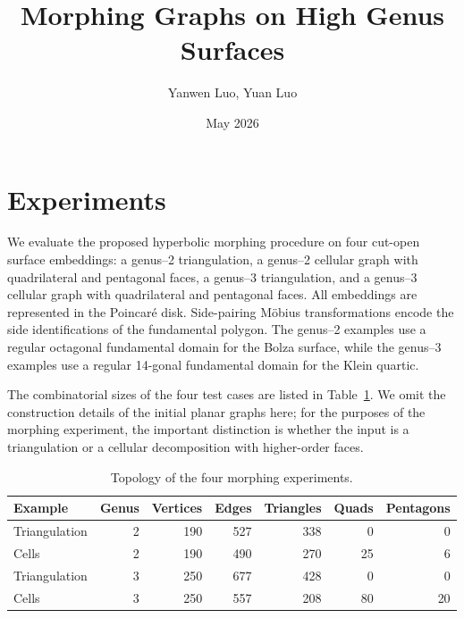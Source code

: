 \documentclass[12pt]{article}
\author{Yanwen Luo, Yuan Luo}
\title{Morphing Graphs on High Genus Surfaces}
\date{May 2026}
\theoremstyle{definition}
\theoremstyle{remark}
\numberwithin{equation}{section}
\begin{document}
\maketitle
\providecommand{\MorphFigurePath}{pictures}
\svgpath{{\MorphFigurePath/}}

\section{Experiments}
\label{sec:experiments}

We evaluate the proposed hyperbolic morphing procedure on four cut-open surface embeddings: a genus--2 triangulation, a genus--2 cellular graph with quadrilateral and pentagonal faces, a genus--3 triangulation, and a genus--3 cellular graph with quadrilateral and pentagonal faces. All embeddings are represented in the Poincaré disk. Side-pairing Möbius transformations encode the side identifications of the fundamental polygon. The genus--2 examples use a regular octagonal fundamental domain for the Bolza surface, while the genus--3 examples use a regular 14-gonal fundamental domain for the Klein quartic.

The combinatorial sizes of the four test cases are listed in Table~\ref{tab:morph-topology-counts}. We omit the construction details of the initial planar graphs here; for the purposes of the morphing experiment, the important distinction is whether the input is a triangulation or a cellular decomposition with higher-order faces.

\begin{table}[t]
\centering
\caption{Topology of the four morphing experiments.}
\label{tab:morph-topology-counts}
\begin{tabular}{lrrrrrr}
\hline
Example & Genus & Vertices & Edges & Triangles & Quads & Pentagons \\
\hline
Triangulation & 2 & 190 & 527 & 338 & 0 & 0 \\
Cells & 2 & 190 & 490 & 270 & 25 & 6 \\
Triangulation & 3 & 250 & 677 & 428 & 0 & 0 \\
Cells & 3 & 250 & 557 & 208 & 80 & 20 \\
\hline
\end{tabular}
\end{table}
\end{document}

